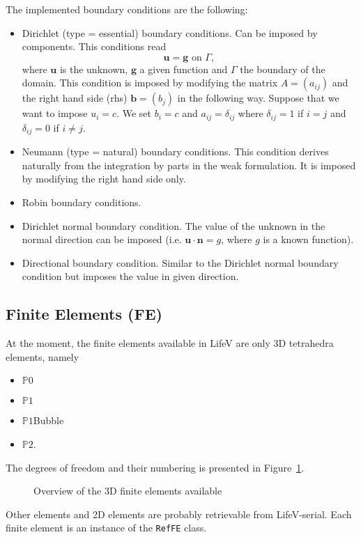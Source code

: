\documentclass[11pt]{article}
\begin{document}
The implemented boundary conditions are the following:
\begin{itemize}
\item Dirichlet (type = essential) boundary conditions. Can be imposed by components. This conditions read
\begin{equation}
\mathbf{u} = \mathbf{g} \text{ on }\Gamma,
\end{equation}
where $\mathbf{u}$ is the unknown, $\mathbf{g}$ a given function and $\Gamma$ the boundary of the domain. This condition is imposed by modifying the matrix $A=(a_{ij})$ and the right hand side (rhs) $\mathbf{b}=(b_j)$ in the following way. Suppose that we want to impose $u_i=c$. We set $b_i=c$ and $a_{ij}=\delta_{ij}$ where $\delta_{ij}=1$ if $i=j$ and $\delta_{ij}=0$ if $i\neq j$.
\item Neumann (type = natural) boundary conditions. This condition derives naturally from the integration by parts in the weak formulation. It is imposed by modifying the right hand side only.
\item Robin boundary conditions.
\item Dirichlet normal boundary condition. The value of the unknown in the normal direction can be imposed (i.e. $\mathbf{u}\cdot\mathbf{n}=g$, where $g$ is a known function).
\item Directional boundary condition. Similar to the Dirichlet normal boundary condition but imposes the value in given direction.
\end{itemize}

\subsection{Finite Elements (FE)}
\label{sec:FE}
At the moment, the finite elements available in LifeV are only 3D tetrahedra elements, namely
\begin{itemize}
\item $\mathbb{P}0$
\item $\mathbb{P}1$
\item $\mathbb{P}1$Bubble
\item $\mathbb{P}2$.
\end{itemize}
The degrees of freedom and their numbering is presented in Figure~\ref{fig:FE}.
\begin{figure}[H]
\begin{center}
\end{center}
\caption{Overview of the 3D finite elements available}
\label{fig:FE}
\end{figure}
Other elements and 2D elements are probably retrievable from LifeV-serial. Each finite element is an instance of the \texttt{RefFE} class.
\end{document}
